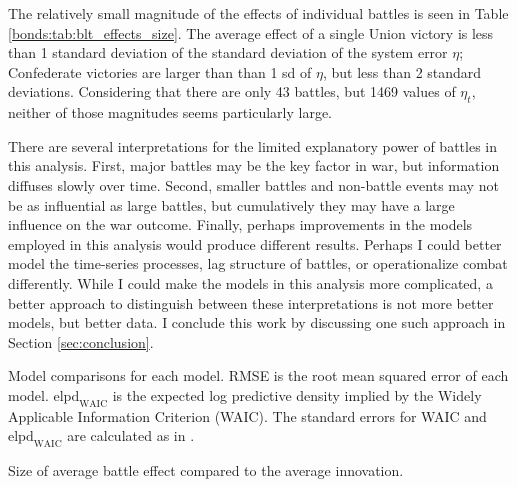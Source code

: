 The relatively small magnitude of the effects of individual battles is seen in Table \ref{bonds:tab:blt_effects_size}.
The average effect of a single Union victory is less than 1 standard deviation of the standard deviation of the system error $\eta$; Confederate victories are larger than than 1 sd of $\eta$, but less than 2 standard deviations.
Considering that there are only 43 battles, but 1469 values of $\eta_{t}$, neither of those magnitudes seems particularly large.

There are several interpretations for the limited explanatory power of battles in this analysis.
First, major battles may be the key factor in war, but information diffuses slowly over time.
Second, smaller battles and non-battle events may not be as influential as large battles, but cumulatively they may have a large influence on the war outcome.
Finally, perhaps improvements in the models employed in this analysis would produce different results.
Perhaps I could better model the time-series processes, lag structure of battles, or operationalize combat differently.
While I could make the models in this analysis more complicated, a better approach to distinguish between these interpretations is not more better models, but better data.
I conclude this work by discussing one such approach in Section \ref{sec:conclusion}.

\begin{table}[!htpb]
  \centering
  
  \caption[Model comparisons for models of bond yields.]{
    Model comparisons for each model.
    RMSE is the root mean squared error of each model.
    $\text{elpd}_{\text{WAIC}}$ is the expected log predictive density implied by the Widely Applicable Information Criterion (WAIC).
    The standard errors for WAIC and $\text{elpd}_{\text{WAIC}}$ are calculated as in \textcite{GelmanVehtari2014a}.
  }
  \label{bonds:tab:waic}
\end{table}

\begin{table}[!htpb]
  \centering
  
  \caption{Size of average battle effect compared to the average innovation.}
  \label{bonds:tab:blt_effects_size}
\end{table}



